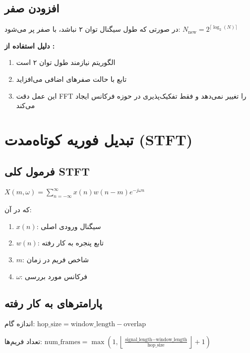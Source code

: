 \documentclass{article}
\begin{document}
\begin{RTL}
\subsection{افزودن صفر }
در صورتی که طول سیگنال توان ۲ نباشد، با صفر پر می‌شود:
\beginL $
N_\text{new} = 2^{\lceil \log_2(N) \rceil}
$\\ \endL

\textbf{دلیل استفاده از :}
\begin{enumerate}[label=\alph*)]
\item الگوریتم  نیازمند طول توان ۲ است
\item تابع  با حالت  صفرهای اضافی می‌افزاید
\item این عمل دقت FFT را تغییر نمی‌دهد و فقط تفکیک‌پذیری در حوزه فرکانس ایجاد می‌کند
\end{enumerate}

\section{تبدیل فوریه کوتاه‌مدت (STFT)}

\subsection{فرمول کلی STFT}
\beginL $
X(m, \omega) = \sum_{n=-\infty}^{\infty} x(n) w(n-m) e^{-j\omega n}
$\\ \endL

که در آن:
\begin{enumerate}[label=\alph*)]
\item $x(n)$: سیگنال ورودی اصلی
\item $w(n)$: تابع پنجره به کار رفته
\item $m$: شاخص فریم در زمان
\item $\omega$: فرکانس مورد بررسی
\end{enumerate}

\subsection{پارامترهای به کار رفته}
اندازه گام:
\beginL $
\text{hop\_size} = \text{window\_length} - \text{overlap}
$\\ \endL

تعداد فریم‌ها:
\beginL $
\text{num\_frames} = \max\left(1, \left\lfloor\frac{\text{signal\_length} - \text{window\_length}}{\text{hop\_size}}\right\rfloor + 1\right)
$\\ \endL


\end{RTL}
\end{document}
